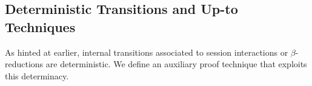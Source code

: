 
\subsection{Deterministic Transitions and Up-to Techniques}
\label{ss:deter}

As hinted at earlier, internal transitions associated to session interactions or  
$\beta$-reductions are deterministic.  We define an auxiliary proof technique that exploits this determinacy.
		

